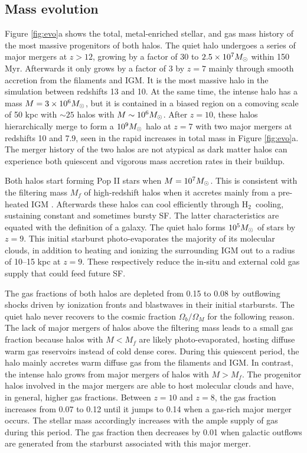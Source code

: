 \documentclass[12pt]{article}
\newcommand{\hh}{H$_2$}
\newcommand{\Ms}{\ifmmode{M_\odot}\else{$M_\odot$}\fi}
\begin{document}
\subsection*{Mass evolution}
\label{sec:halo}


Figure \ref{fig:evo}a shows the total, metal-enriched stellar, and gas
mass history of the most massive progenitors of both halos.  The quiet
halo undergoes a series of major mergers at $z > 12$, growing by a
factor of 30 to $2.5 \times 10^7 \Ms$ within 150 Myr.  Afterwards it
only grows by a factor of 3 by $z=7$ mainly through smooth accretion
from the filaments and IGM.  It is the most massive halo in the
simulation between redshifts 13 and 10.  At the same time, the intense
halo has a mass $M = 3 \times 10^6 \Ms$, but it is contained in a
biased region on a comoving scale of 50 kpc with $\sim25$ halos with
$M \sim 10^6 \Ms$.  After $z=10$, these halos hierarchically merge to
form a $10^9 \Ms$ halo at $z=7$ with two major mergers at redshifts 10
and 7.9, seen in the rapid increases in total mass in Figure
\ref{fig:evo}a.  The merger history of the two halos are not atypical
as dark matter halos can experience both quiescent and vigorous mass
accretion rates in their buildup.

Both halos start forming Pop II stars when $M = 10^7 \Ms$.  This is
consistent with the filtering mass $M_f$ of high-redshift halos when
it accretes mainly from a pre-heated IGM \cite{gnedin98, gnedin00,
  Wise08_Gal}.  Afterwards these halos can cool efficiently through
\hh~cooling, sustaining constant and sometimes bursty SF.  The latter
characteristics are equated with the definition of a galaxy.  The
quiet halo forms $10^5 \Ms$ of stars by $z=9$.  This initial starburst
photo-evaporates the majority of its molecular clouds, in addition to
heating and ionizing the surrounding IGM out to a radius of 10--15 kpc
at $z=9$.  These respectively reduce the in-situ and external cold gas
supply that could feed future SF.

The gas fractions of both halos are depleted from 0.15 to 0.08 by
outflowing shocks driven by ionization fronts and blastwaves in their
initial starbursts.  The quiet halo never recovers to the cosmic
fraction $\Omega_b/\Omega_M$ for the following reason.  The lack of
major mergers of halos above the filtering mass leads to a small gas
fraction because halos with $M < M_f$ are likely photo-evaporated,
hosting diffuse warm gas reservoirs instead of cold dense cores.
During this quiescent period, the halo mainly accretes warm diffuse
gas from the filaments and IGM.  In contrast, the intense halo grows
from major mergers of halos with $M > M_f$.  The progenitor halos
involved in the major mergers are able to host molecular clouds and
have, in general, higher gas fractions.  Between $z=10$ and $z=8$, the
gas fraction increases from 0.07 to 0.12 until it jumps to 0.14 when a
gas-rich major merger occurs.  The stellar mass accordingly increases
with the ample supply of gas during this period.  The gas fraction
then decreases by 0.01 when galactic outflows are generated from the
starburst associated with this major merger.
\end{document}
